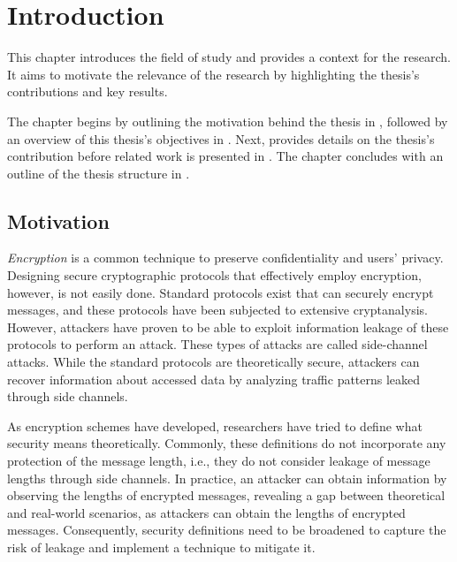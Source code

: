 \chapter{Introduction\label{ch:intro}}

This chapter introduces the field of study and provides a context for the research. It aims to motivate the relevance of the research by highlighting the thesis's contributions and key results.

The chapter begins by outlining the motivation behind the thesis in , followed by an overview of this thesis's objectives in . Next,  provides details on the thesis's contribution before related work is presented in . The chapter concludes with an outline of the thesis structure in .

\clearpage

\section{Motivation\label{sec:motivation-intro}}

\textit{Encryption} is a common technique to preserve confidentiality and users' privacy. Designing secure cryptographic protocols that effectively employ encryption, however, is not easily done. Standard protocols exist that can securely encrypt messages, and these protocols have been subjected to extensive cryptanalysis. However, attackers have proven to be able to exploit information leakage of these protocols to perform an attack. These types of attacks are called side-channel attacks. While the standard protocols are theoretically secure, attackers can recover information about accessed data by analyzing traffic patterns leaked through side channels.

As encryption schemes have developed, researchers have tried to define what security means theoretically. Commonly, these definitions do not incorporate any protection of the message length, i.e., they do not consider leakage of message lengths through side channels. In practice, an attacker can obtain information by observing the lengths of encrypted messages, revealing a gap between theoretical and real-world scenarios, as attackers can obtain the lengths of encrypted messages. Consequently, security definitions need to be broadened to capture the risk of leakage and implement a technique to mitigate it.

